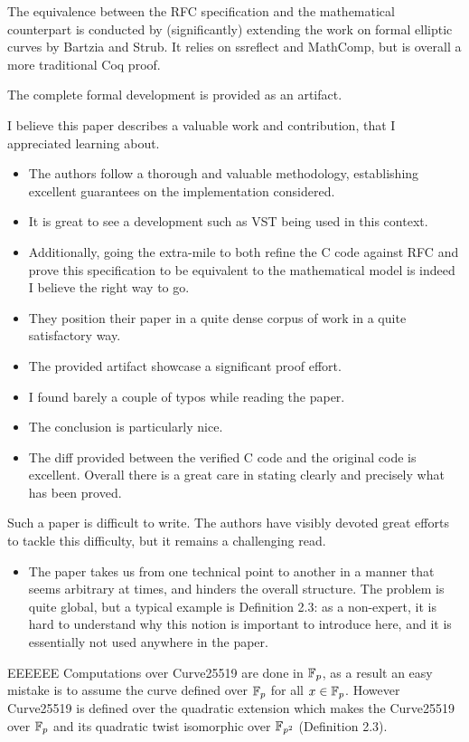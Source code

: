 The equivalence between the RFC specification and the mathematical counterpart
is conducted by (significantly) extending the work on formal elliptic curves by
Bartzia and Strub. It relies on ssreflect and MathComp, but is overall a more
traditional Coq proof.

The complete formal development is provided as an artifact.

\begin{center}
\end{center}
I believe this paper describes a valuable work and contribution, that I appreciated learning about.
\begin{itemize}
    \item The authors follow a thorough and valuable methodology, establishing excellent guarantees on the implementation considered.
    \item It is great to see a development such as VST being used in this context.
    \item Additionally, going the extra-mile to both refine the C code against RFC and prove this specification to be equivalent to the mathematical model is indeed I believe the right way to go.
    \item They position their paper in a quite dense corpus of work in a quite satisfactory way.
    \item The provided artifact showcase a significant proof effort.
    \item I found barely a couple of typos while reading the paper.
    \item The conclusion is particularly nice.
    \item The diff provided between the verified C code and the original code is excellent. Overall there is a great care in stating clearly and precisely what has been proved.
\end{itemize}

\begin{center}
\end{center}

Such a paper is difficult to write. The authors have visibly devoted great efforts to tackle this difficulty, but it remains a challenging read.
\begin{itemize}
    \item The paper takes us from one technical point to another in a manner that seems arbitrary at times, and hinders the overall structure. The problem is quite global, but a typical example is Definition 2.3: as a non-expert, it is hard to understand why this notion is important to introduce here, and it is essentially not used anywhere in the paper.
\end{itemize}
\begin{answer}{EEEEEE}
    Computations over Curve25519 are done in $\mathbb{F}_{p}$, as a result an easy mistake is to assume the curve defined over $\mathbb{F}_{p}$ for all $x \in \mathbb{F}_{p}$. However Curve25519 is defined over the quadratic extension which makes the Curve25519 over $\mathbb{F}_{p}$ and its quadratic twist isomorphic over $\mathbb{F}_{p^2}$ (Definition 2.3).
\end{answer}

